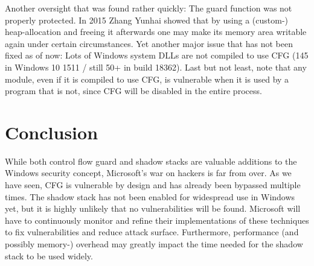 \documentclass[10pt,twocolumn,a4paper]{article}
\begin{document}
Another oversight that was found rather quickly: The guard function was not properly protected.
In 2015 Zhang Yunhai showed that by using a (custom-) heap-allocation and freeing it afterwards one may make its memory area writable again under certain circumstances\cite{cfgbypass}.
Yet another major issue that has not been fixed as of now:
Lots of Windows system DLLs are not compiled to use CFG (145 in Windows 10 1511 / still 50+ in build 18362\cite{cfgbypass2}).
Last but not least, note that any module, even if it is compiled to use CFG, is vulnerable when it is used by a program that is not, since CFG will be disabled in the entire process\cite{cfgexplore}.

\section{Conclusion}\label{sec:conclusion}

While both control flow guard and shadow stacks are valuable additions to the Windows security concept, Microsoft's war on hackers is far from over. As we have seen, CFG is vulnerable by design and has already been bypassed multiple times. The shadow stack has not been enabled for widespread use in Windows yet, but it is highly unlikely that no vulnerabilities will be found.
Microsoft will have to continuously monitor and refine their implementations of these techniques to fix vulnerabilities and reduce attack surface.
Furthermore, performance (and possibly memory-) overhead may greatly impact the time needed for the shadow stack to be used widely.



\end{document}
